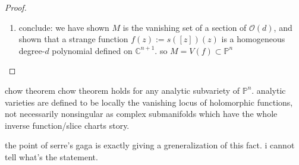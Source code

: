 \begin{proof}
\begin{enumerate}[label=\textbf{Step \arabic*}]
\begin{proof}
\(f\) is holomorphic because \(s\) is, and defined in all \(\mathbb{C}^{n+1}\) except \(0\). so by Hartogs theorem we define in it on zero too---and it's clearly (take the limit) homogeneous of degree \(d\); though not obviously a polynomial.

we show it is a polynomial. so far we know it's homogeneous, i.e. \(f(\lambda z)=\lambda^df(z)\). so write for nonzero \(z\),
\[|f(z)|=\left| f\left(|z|\frac{z}{|z|}\right) \right| =|z|^df\left(\frac{z}{|z|}\right)\leq  C |z|^d\]
for the sup of \(f\) in the ball of radius 1. This means the taylor series of \(f\) (holomorphic multivariable functions have taylor series) has no terms of order less than \(d\), because if we took the quotient \(\|f(z)/z^d\|\), it would go to infinity as we get closer to zero, and we're saying it's bounded.

now define \(p\) to be the terms of \(f\) that have degree \(d\) and let \(r=f-d\), the terms that don't have degree \(d\). if we show \(r \equiv 0\) we're done. \(r\) is \(d\)-homogeneous because \(f\) and \(p\) are. and also the taylor series of \(r\) starts with terms of degree \(d+1\). so we can factor \(z^{d+1}\) out of that taylor series and realise that inside the unit ball
\[|r(z)| \leq  C' |z|^{d+1}\]
for \(C'\) the supremum over the unit ball of what's left after we factorized \(z^{d+1}\).

then pick any \(z \in \mathbb{C}^{n+1}\) and put it inside the unit ball via multiplying by a small \(\varepsilon\). then
\[|r(z)|=\varepsilon^{-d}\left|r\left(\varepsilon z\right)\right|\leq \varepsilon^{-d} C' \left| \varepsilon z\right|^{d+1}= \varepsilon C'\]
which is zero as \(\varepsilon \to 0\).
	\end{proof}
\item conclude: we have shown \(M\) is the vanishing set of a section of \(\mathcal{O}(d)\), and shown that a strange function \(f(z):=s([z])(z)\) is a homogeneous degree-\(d\) polynomial defined on \(\mathbb{C}^{n+1}\). so \(M=V(f)\subset\mathbb{P}^n\)
\end{enumerate}
\end{proof}

\begin{thing6}{chow theorem}\leavevmode
chow theorem holds for any analytic subvariety of \(\mathbb{P}^n\). analytic varieties are defined to be locally the vanishing locus of holomorphic functions, not necessarily nonsingular as complex submanifolds which have the whole inverse function/slice charts story.

the point of serre's gaga is exactly giving a greneralization of this fact. i cannot tell what's the statement.
\end{thing6}

